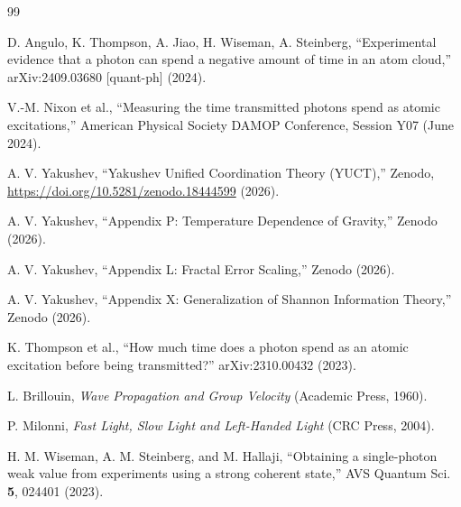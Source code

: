 \documentclass[12pt,a4paper]{article}
\begin{document}
	\begin{thebibliography}{99}
		
		D. Angulo, K. Thompson, A. Jiao, H. Wiseman, A. Steinberg, ``Experimental evidence that a photon can spend a negative amount of time in an atom cloud,'' arXiv:2409.03680 [quant-ph] (2024).
		
		V.-M. Nixon et al., ``Measuring the time transmitted photons spend as atomic excitations,'' American Physical Society DAMOP Conference, Session Y07 (June 2024).
		
		A. V. Yakushev, ``Yakushev Unified Coordination Theory (YUCT),'' Zenodo, \url{https://doi.org/10.5281/zenodo.18444599} (2026).
		
		A. V. Yakushev, ``Appendix P: Temperature Dependence of Gravity,'' Zenodo (2026).
		
		A. V. Yakushev, ``Appendix L: Fractal Error Scaling,'' Zenodo (2026).
		
		A. V. Yakushev, ``Appendix X: Generalization of Shannon Information Theory,'' Zenodo (2026).
		
		K. Thompson et al., ``How much time does a photon spend as an atomic excitation before being transmitted?'' arXiv:2310.00432 (2023).
		
		L. Brillouin, \textit{Wave Propagation and Group Velocity} (Academic Press, 1960).
		
		P. Milonni, \textit{Fast Light, Slow Light and Left-Handed Light} (CRC Press, 2004).
		
		H. M. Wiseman, A. M. Steinberg, and M. Hallaji, ``Obtaining a single-photon weak value from experiments using a strong coherent state,'' AVS Quantum Sci. \textbf{5}, 024401 (2023).
		
	\end{thebibliography}
	
\end{document}
